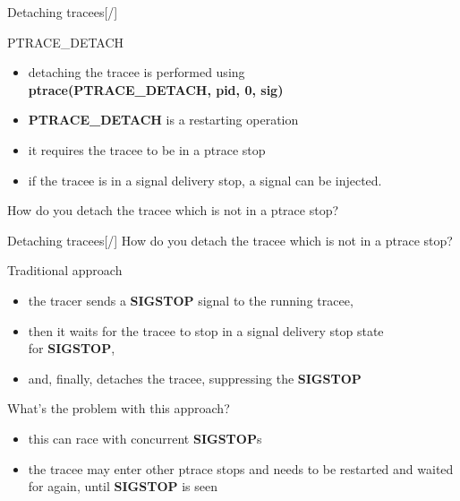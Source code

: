 \documentclass[unicode,aspectratio=169,xcolor={table,dvipsnames,usenames}]{beamer}
\begin{document}
\begin{frame}{\Large Detaching tracees\hfill [\insertframenumber/\inserttotalframenumber]}
\Large
\begin{block}{PTRACE\_DETACH}
\begin{itemize}
	\item detaching the tracee is performed using \\
		\textbf{ptrace(PTRACE\_DETACH, pid, 0, sig)}
	\item \textbf{PTRACE\_DETACH} is a restarting operation
	\item it requires the tracee to be in a ptrace stop
	\item if the tracee is in a signal delivery stop,
		a signal can be injected.
\end{itemize}
\end{block}

How do you detach the tracee which is not in a ptrace stop?
\end{frame}

\begin{frame}{\Large Detaching tracees\hfill [\insertframenumber/\inserttotalframenumber]}
\Large
How do you detach the tracee which is not in a ptrace stop?

\begin{block}{Traditional approach}
\begin{itemize}
	\item the tracer sends a \textbf{SIGSTOP} signal to the running tracee,
	\item then it waits for the tracee to stop in a signal delivery stop state \\
		for \textbf{SIGSTOP},
	\item and, finally, detaches the tracee, suppressing the \textbf{SIGSTOP}
\end{itemize}
\end{block}

\begin{block}{What's the problem with this approach?}
\begin{itemize}
	\item this can race with concurrent \textbf{SIGSTOP}s
	\item the tracee may enter other ptrace stops and needs
		to be restarted and waited for again, until \textbf{SIGSTOP} is seen
\end{itemize}
\end{block}
\end{frame}
\end{document}
